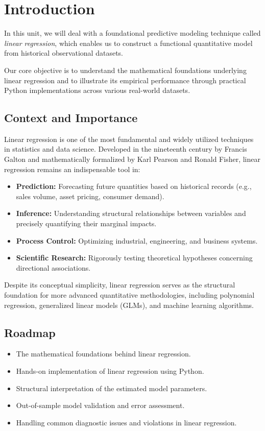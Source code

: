 \section{Introduction}

In this unit, we will deal with a foundational predictive modeling technique called \emph{linear regression}, which enables us to construct a functional quantitative model from historical observational datasets.

Our core objective is to understand the mathematical foundations underlying linear regression and to illustrate its empirical performance through practical Python implementations across various real-world datasets.

\subsection{Context and Importance}

Linear regression is one of the most fundamental and widely utilized techniques in statistics and data science. Developed in the nineteenth century by Francis Galton and mathematically formalized by Karl Pearson and Ronald Fisher, linear regression remains an indispensable tool in:

\begin{itemize}
	\item \textbf{Prediction:} Forecasting future quantities based on historical records (e.g., sales volume, asset pricing, consumer demand).
	\item \textbf{Inference:} Understanding structural relationships between variables and precisely quantifying their marginal impacts.
	\item \textbf{Process Control:} Optimizing industrial, engineering, and business systems.
	\item \textbf{Scientific Research:} Rigorously testing theoretical hypotheses concerning directional associations.
\end{itemize}

Despite its conceptual simplicity, linear regression serves as the structural foundation for more advanced quantitative methodologies, including polynomial regression, generalized linear models (GLMs), and machine learning algorithms.

\subsection{Roadmap}
\begin{itemize}
	\item The mathematical foundations behind linear regression.
	\item Hands-on implementation of linear regression using Python.
	\item Structural interpretation of the estimated model parameters.
	\item Out-of-sample model validation and error assessment.
	\item Handling common diagnostic issues and violations in linear regression.
\end{itemize}

